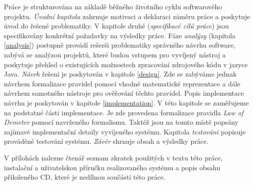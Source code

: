Práce je strukturována na základě běžného životního cyklu softwarového projektu. \emph{Úvodní kapitola} zahrnuje motivaci a deklaraci záměru práce a poskytuje úvod do řešené problematiky. V kapitole druhé (\emph{specifikacé cílů práce}) jsou specifikovány konkrétní požadavky na výsledky práce. Fáze \emph{analýzy} (kapitola \ref{analysis}) postupně provádí rešerši problematiky správného návrhu software, zabývá se analýzou projektů, které budou vstupem pro vyvíjený nástroj a poskytuje přehled o existujících možnostech zpracování zdrojového kódu v jazyce Java. \emph{Návrh} řešení je poskytován v kapitole \ref{design}. Zde se zabýváme jednak návrhem formalizace pravidel pomocí vhodné matematické reprezentace a dále návrhem samotného nástroje pro ověřování těchto pravidel. Popis implementace návrhu je poskytován v kapitole \ref{implementation}. V této kapitole se zaměřujeme na podstatné části implementace. Je zde provedena formalizace pravidla \emph{Law of Demeter} pomocí navrženého formalismu. Taktéž jsou na tomto místě popsány zajímavé implementační detaily vyvíjeného systému. Kapitola \emph{testování} popisuje prováděné testování systému. \emph{Závěr} shrnuje obsah a výsledky práce.

V přílohách nalezne čtenář seznam zkratek použitých v textu této práce, instalační a uživatelskou příručku realizovaného systému a popis obsahu přiloženého CD, které je nedílnou součástí této práce.
